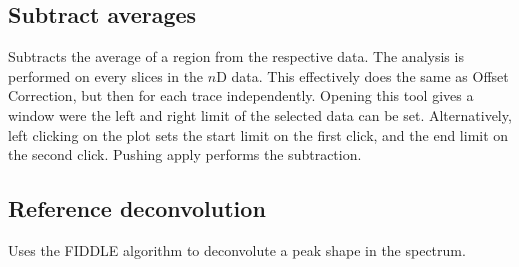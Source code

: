 \documentclass[11pt,a4paper]{article}
\begin{document}


\subsection{Subtract averages}
Subtracts the average of a region from the respective data. The analysis is performed on every slices in the $n$D data. This effectively does the same as Offset Correction, but then for each trace independently.
Opening this tool gives a window were the left and right limit of the selected data can be set. Alternatively, left clicking on the plot sets the start limit on the first click, and the end limit on the second click. Pushing apply performs the subtraction.

\subsection{Reference deconvolution}
Uses the FIDDLE algorithm to deconvolute a peak shape in the spectrum.
\end{document}
